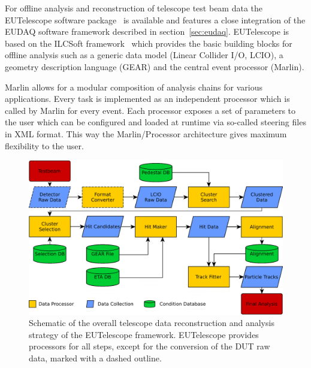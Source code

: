 

For offline analysis and reconstruction of telescope test beam data the EUTelescope software package~\cite{ref:eutelwebsite}
 is available and features a close integration of the EUDAQ software framework described in section~\ref{sec:eudaq}.
EUTelescope is based on the ILCSoft framework~\cite{ref:eudetmemo_2009_12} which provides the basic building blocks for offline analysis such as a generic data model (Linear Collider I/O, LCIO),
a geometry description language (GEAR) and the central event processor (Marlin).

Marlin allows for a modular composition of analysis chains for various applications. Every task is implemented as an independent processor which is called by Marlin for every event. 
Each processor exposes a set of parameters to the user which can be configured and loaded at runtime via so-called steering files in XML format.
This way the Marlin/Processor architecture gives maximum flexibility to the user.

\begin{figure}[tbp]
  \center
  \includegraphics[width=.9\textwidth]{figures/eutel-strategy}
  \caption[The EUTelescope data analysis strategy]{Schematic of the overall telescope data reconstruction and analysis strategy of the EUTelescope framework.
EUTelescope provides processors for all steps, except for the conversion of the DUT raw data, marked with a dashed outline.}
  \label{fig:offline:strategy}
\end{figure}

